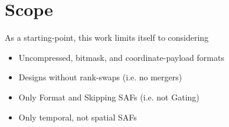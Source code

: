 \section{Scope}

As a starting-point, this work limits itself to considering

\begin{itemize}
    \item Uncompressed, bitmask, and coordinate-payload formats
    \item Designs without rank-swaps (i.e. no mergers\cite{gamma}\cite{teaal})
    \item Only Format and Skipping SAFs (i.e. not Gating)
    \item Only temporal, not spatial\cite{sparseloop} SAFs
\end{itemize}
